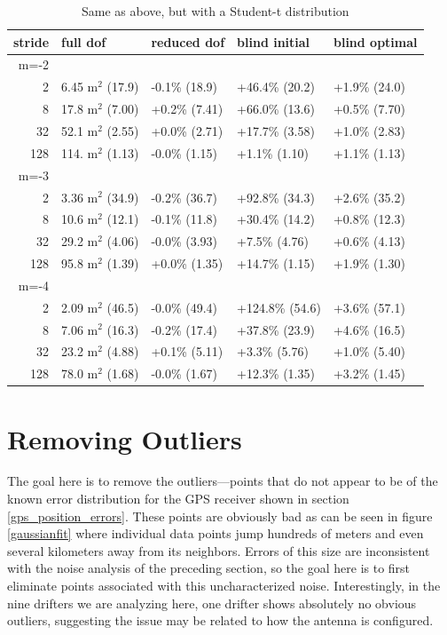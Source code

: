\documentclass[10pt,journal]{IEEEtran}
\begin{document}
\begin{table}[ht]
\caption{Same as above, but with a Student-t distribution }
\label{fit_results_tdistribution}
\centering
\begin{tabular}{r | llll} stride & full dof & reduced dof & blind initial & blind optimal \\ \hline \hline 
m=-2 &&&&  \\ \hline 
2 & 6.45 m$^2$ (17.9) &  -0.1\% (18.9) &  +46.4\% (20.2) &  +1.9\% (24.0) \\ 
8 & 17.8 m$^2$ (7.00) &  +0.2\% (7.41) &  +66.0\% (13.6) &  +0.5\% (7.70) \\ 
32 & 52.1 m$^2$ (2.55) &  +0.0\% (2.71) &  +17.7\% (3.58) &  +1.0\% (2.83) \\ 
128 & 114. m$^2$ (1.13) &  -0.0\% (1.15) &  +1.1\% (1.10) &  +1.1\% (1.13) \\ 
m=-3 &&&&  \\ \hline 
2 & 3.36 m$^2$ (34.9) &  -0.2\% (36.7) &  +92.8\% (34.3) &  +2.6\% (35.2) \\ 
8 & 10.6 m$^2$ (12.1) &  -0.1\% (11.8) &  +30.4\% (14.2) &  +0.8\% (12.3) \\ 
32 & 29.2 m$^2$ (4.06) &  -0.0\% (3.93) &  +7.5\% (4.76) &  +0.6\% (4.13) \\ 
128 & 95.8 m$^2$ (1.39) &  +0.0\% (1.35) &  +14.7\% (1.15) &  +1.9\% (1.30) \\ 
m=-4 &&&&  \\ \hline 
2 & 2.09 m$^2$ (46.5) &  -0.0\% (49.4) &  +124.8\% (54.6) &  +3.6\% (57.1) \\ 
8 & 7.06 m$^2$ (16.3) &  -0.2\% (17.4) &  +37.8\% (23.9) &  +4.6\% (16.5) \\ 
32 & 23.2 m$^2$ (4.88) &  +0.1\% (5.11) &  +3.3\% (5.76) &  +1.0\% (5.40) \\ 
128 & 78.0 m$^2$ (1.68) &  -0.0\% (1.67) &  +12.3\% (1.35) &  +3.2\% (1.45) \\ 
\end{tabular} 

\end{table}

\section{Removing Outliers}
\label{sec:outliers}

The goal here is to remove the outliers---points that do not appear to be of the known error distribution for the GPS receiver shown in section \ref{gps_position_errors}. These points are obviously bad as can be seen in figure \ref{gaussianfit} where individual data points jump hundreds of meters and even several kilometers away from its neighbors. Errors of this size are inconsistent with the noise analysis of the preceding section, so the goal here is to first eliminate points associated with this uncharacterized noise. Interestingly, in the nine drifters we are analyzing here, one drifter shows absolutely no obvious outliers, suggesting the issue may be related to how the antenna is configured.
\end{document}
